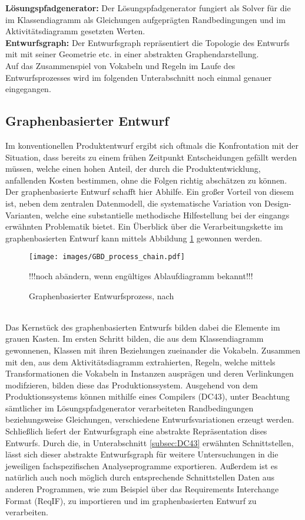 \textbf{Lösungspfadgenerator:} Der Lösungspfadgenerator fungiert als Solver für die im Klassendiagramm als Gleichungen aufgeprägten Randbedingungen und im Aktivitätsdiagramm gesetzten Werten.\\

\textbf{Entwurfsgraph:} Der Entwurfsgraph repräsentiert die Topologie des Entwurfs mit mit seiner Geometrie etc. in einer abstrakten Graphendarstellung.\\

Auf das Zusammenspiel von Vokabeln und Regeln im Laufe des Entwurfsprozesses wird im folgenden Unterabschnitt noch einmal genauer eingegangen.

\subsection{Graphenbasierter Entwurf}
\label{subsec:GBE}
Im konventionellen Produktentwurf ergibt sich oftmals die Konfrontation mit der Situation, dass bereits zu einem frühen Zeitpunkt Entscheidungen gefällt werden müssen, welche einen hohen Anteil, der durch die Produktentwicklung, anfallenden Kosten bestimmen, ohne die Folgen richtig abschätzen zu können. Der graphenbasierte Entwurf schafft hier Abhilfe. Ein großer Vorteil von diesem ist, neben dem zentralen Datenmodell, die systematische Variation von Design-Varianten, welche eine substantielle methodische Hilfestellung bei der eingangs erwähnten Problematik bietet. Ein Überblick über die Verarbeitungskette im graphenbasierten Entwurf kann mittels Abbildung \ref{img:Graph_Based_Design} gewonnen werden.
\begin{figure}
	\centering
	\texttt{[image: images/GBD\_process\_chain.pdf]}
	\caption{Graphenbasierter Entwurfsprozess, nach \cite{Rud14}} !!!noch abändern, wenn engültiges Ablaufdiagramm bekannt!!!\label{img:Graph_Based_Design}
\end{figure}\\
Das Kernstück des graphenbasierten Entwurfs bilden dabei die Elemente im grauen Kasten. Im ersten Schritt bilden, die aus dem Klassendiagramm gewonnenen, Klassen mit ihren Beziehungen zueinander die Vokabeln. Zusammen mit den, aus dem Aktivitätsdiagramm extrahierten, Regeln, welche mittels Transformationen die Vokabeln in Instanzen ausprägen und deren Verlinkungen modifzieren, bilden diese das Produktionssystem. Ausgehend von dem Produktionssystems können mithilfe eines Compilers (DC43), unter Beachtung sämtlicher im Lösungspfadgenerator verarbeiteten Randbedingungen beziehungsweise Gleichungen, verschiedene Entwurfsvariationen erzeugt werden. Schließlich liefert der Entwurfsgraph eine abstrakte Repräsentation dises Entwurfs. Durch die, in Unterabschnitt \ref{subsec:DC43} erwähnten Schnittstellen, lässt sich dieser abstrakte Entwurfsgraph für weitere Untersuchungen in die jeweiligen fachspezifischen Analyseprogramme exportieren. Außerdem ist es natürlich auch noch möglich durch entsprechende Schnittstellen Daten aus anderen Programmen, wie zum Beispiel über das Requirements Interchange Format (ReqIF), zu importieren und im graphenbasierten Entwurf zu verarbeiten.\\
